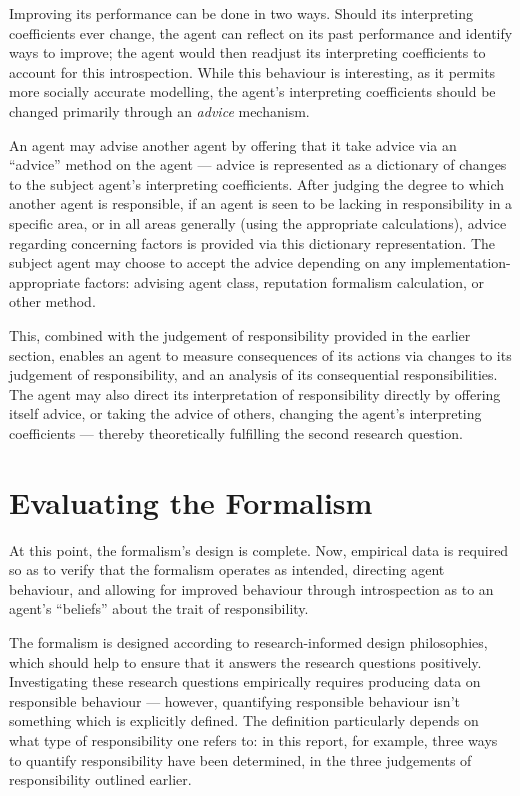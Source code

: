 Improving its performance can be done in two ways. Should its interpreting coefficients ever change, the agent can reflect on its past performance and identify ways to improve; the agent would then readjust its interpreting coefficients to account for this introspection. While this behaviour is interesting, as it permits more socially accurate modelling, the agent's interpreting coefficients should be changed primarily through an \emph{advice} mechanism.\par

An agent may advise another agent by offering that it take advice via an ``advice'' method on the agent --- advice is represented as a dictionary of changes to the subject agent's interpreting coefficients. After judging the degree to which another agent is responsible, if an agent is seen to be lacking in responsibility in a specific area, or in all areas generally (using the appropriate calculations), advice regarding concerning factors is provided via this dictionary representation. The subject agent may choose to accept the advice depending on any implementation-appropriate factors: advising agent class, reputation formalism calculation, or other method.\par

This, combined with the judgement of responsibility provided in the earlier section, enables an agent to measure consequences of its actions via changes to its judgement of responsibility, and an analysis of its consequential responsibilities. The agent may also direct its interpretation of responsibility directly by offering itself advice, or taking the advice of others, changing the agent's interpreting coefficients --- thereby theoretically fulfilling the second research question.\par


\section{Evaluating the Formalism}\label{sec:evaluation}
At this point, the formalism's design is complete. Now, empirical data is required so as to verify that the formalism operates as intended, directing agent behaviour, and allowing for improved behaviour through introspection as to an agent's ``beliefs'' about the trait of responsibility.\par

The formalism is designed according to research-informed design philosophies, which should help to ensure that it answers the research questions positively. Investigating these research questions empirically requires producing data on responsible behaviour --- however, quantifying responsible behaviour isn't something which is explicitly defined. The definition particularly depends on what type of responsibility one refers to: in this report, for example, three ways to quantify responsibility have been determined, in the three judgements of responsibility outlined earlier.\par

